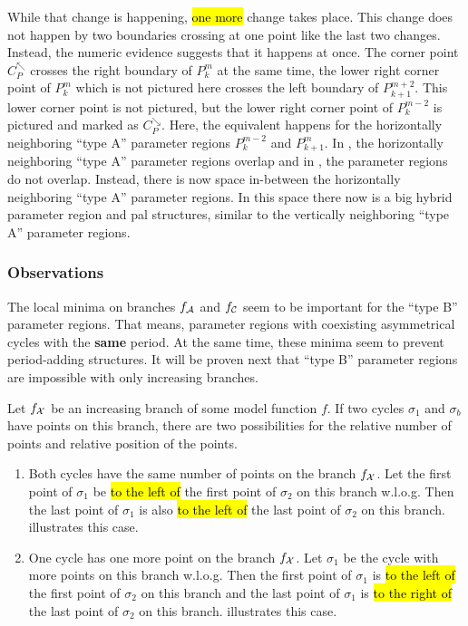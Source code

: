 While that change is happening, \hl{one more} change takes place.
This change does not happen by two boundaries crossing at one point like the last two changes.
Instead, the numeric evidence suggests that it happens at once.
The corner point $C_P^\nwarrow$ crosses the right boundary of $P^m_k$ at the same time, the lower right corner point of $P^{m}_{k}$ which is not pictured here crosses the left boundary of $P^{m+2}_{k+1}$.
This lower corner point is not pictured, but the lower right corner point of $P^{m-2}_k$ is pictured and marked as $C_P^\searrow$.
Here, the equivalent happens for the horizontally neighboring ``type A'' parameter regions $P^{m-2}_k$ and $P^m_{k+1}$.
In , the horizontally neighboring ``type A'' parameter regions overlap and in , the parameter regions do not overlap.
Instead, there is now space in-between the horizontally neighboring ``type A'' parameter regions.
In this space there now is a big hybrid parameter region and \gls{pal} structures, similar to the vertically neighboring ``type A'' parameter regions.

\subsubsection{Observations}

The local minima on branches $f_{\mathcal{A}}$ and $f_{\mathcal{C}}$ seem to be important for the ``type B'' parameter regions.
That means, parameter regions with coexisting asymmetrical cycles with the \textbf{same} period.
At the same time, these minima seem to prevent period-adding structures.
It will be proven next that ``type B'' parameter regions are impossible with only increasing branches.

\begin{lemma}
	Let $f_{\mathcal{X}}$ be an increasing branch of some model function $f$.
	If two cycles $\sigma_1$ and $\sigma_b$ have points on this branch, there are two possibilities for the relative number of points and relative position of the points.
	\begin{enumerate}
		\item Both cycles have the same number of points on the branch $f_{\mathcal{X}}$.
		      Let the first point of $\sigma_1$ be \hl{to the left of} the first point of $\sigma_2$ on this branch w.l.o.g.
		      Then the last point of $\sigma_1$ is also \hl{to the left of} the last point of $\sigma_2$ on this branch.
		       illustrates this case.
		\item One cycle has one more point on the branch $f_{\mathcal{X}}$.
		      Let $\sigma_1$ be the cycle with more points on this branch w.l.o.g.
		      Then the first point of $\sigma_1$ is \hl{to the left of} the first point of $\sigma_2$ on this branch and the last point of $\sigma_1$ is \hl{to the right of} the last point of $\sigma_2$ on this branch.
		       illustrates this case.
	\end{enumerate}
	\label{lemma:add.num.pos.points.increasing}
\end{lemma}

